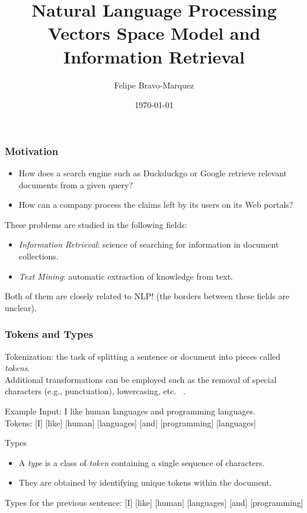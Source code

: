 \documentclass[handout]{beamer}
\title{Natural Language Processing \\ Vectors Space Model and Information Retrieval}
\author[Felipe Bravo Márquez]{\footnotesize
 \textcolor[rgb]{0.00,0.00,1.00}{Felipe Bravo-Marquez}}
\date{\today}
\begin{document}
\begin{frame}
\titlepage


\end{frame}

\begin{frame}\frametitle{Motivation}


  \begin{itemize}
   \item How does a search engine such as Duckduckgo or Google retrieve relevant documents from a given query?
   \item How can a company process the claims left by its users on its Web portals?
  \end{itemize}

These problems are studied in the following fields:

\begin{itemize}
 \item \emph{Information Retrieval}:  science of searching for information in  document collections.
 \item \emph{Text Mining}: automatic extraction of knowledge from text.
\end{itemize}

Both of them are closely related to NLP! (the borders between these fields are unclear).

\end{frame}

\begin{frame}\frametitle{Tokens and Types}
{\footnotesize
Tokenization: the task of splitting a sentence or document into pieces called \emph{tokens}. \\
Additional transformations can be employed such as the removal of special characters (e.g., punctuation), lowercasing, etc. ~\cite{manning2008}. 

\begin{block}{Example}
Input: I like human languages and programming languages.\\
Tokens: [I] [like] [human] [languages] [and] [programming] [languages]
\end{block}



\begin{block}{Types}
\begin{itemize}
 \item A \emph{type} is a class of \emph{token} containing a single sequence of characters.
\item They are obtained by identifying unique tokens within the document.
\end{itemize}

Types for the previous sentence: [I] [like] [human] [languages] [and] [programming]  \\
\end{block}



 }
\end{frame}
\end{document}
